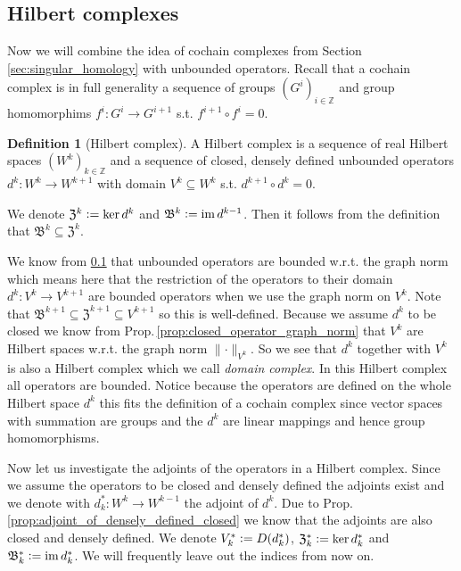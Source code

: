 \documentclass[12pt,a4paper]{article}
\numberwithin{equation}{subsection}
\numberwithin{lemma}{subsection}
\theoremstyle{definition}
\newtheorem{definition}[lemma]{Definition}
\DeclareMathOperator{\Ima}{im}
\newcommand{\integers}{\mathbb{Z}}
\begin{document}
\subsection{Hilbert complexes}

Now we will combine the idea of cochain complexes from Section 
\ref{sec:singular_homology} 
with unbounded operators. Recall that a cochain complex 
is in full generality a sequence of groups $(G^i)_{i\in \integers}$ 
and group homomorphims $f^i: G^i \rightarrow G^{i+1}$ s.t. 
$f^{i+1} \circ f^{i} = 0$.

\begin{definition}[Hilbert complex]
    A Hilbert complex is a sequence of real Hilbert spaces $(W^k)_{k\in \integers}$
    and a sequence of closed, densely defined 
    unbounded operators $d^k: W^k \rightarrow W^{k+1}$ with domain
    $V^k \subseteq W^k$ s.t. $d^{k+1} \circ d^k = 0$.
\end{definition}
\noindent We denote $\mathfrak{Z}^k  \vcentcolon= \ker d^k$ and $\mathfrak{B}^k 
\vcentcolon= \Ima d^{k-1}$. Then it follows from the definition that
$\mathfrak{B}^k \subseteq \mathfrak{Z}^k$.

We know from \ref{} that unbounded operators are bounded w.r.t. the graph norm
which means here that the restriction of the operators to their domain 
$d^k: V^k \rightarrow V^{k+1}$ are bounded operators when we use the graph norm
on $V^k$. Note that $\mathfrak{B}^{k+1} \subseteq \mathfrak{Z}^{k+1} 
\subseteq V^{k+1}$
so this is well-defined. Because we assume $d^k$ to be 
closed we know from Prop.\,\ref{prop:closed_operator_graph_norm}
that $V^k$ are Hilbert spaces w.r.t. the graph norm $\lVert \cdot \rVert _{V^k}$.
So we see that $d^k$ together with $V^k$ is also a Hilbert complex which 
we call \textit{domain complex}. In this Hilbert complex all operators are 
bounded. Notice because the operators are defined on the whole Hilbert space 
$d^k$ this fits the definition of a cochain complex since vector spaces 
with summation
are groups and the $d^k$ are linear mappings and hence group homomorphisms.

Now let us investigate the adjoints of the operators in a Hilbert complex.
Since we assume the operators to be closed and densely defined the adjoints 
exist and we denote with $d_k^*:W^k \rightarrow W^{k-1}$ the adjoint of $d^k$.
Due to Prop.\,\ref{prop:adjoint_of_densely_defined_closed} we know that the 
adjoints are also closed and densely defined. We denote 
$V_k^* \vcentcolon= D(d_k^*)$, $\mathfrak{Z}^*_k \vcentcolon= \ker d^*_k$ 
and $\mathfrak{B}^*_k \vcentcolon= \Ima d^*_k$. We will frequently leave out 
the indices from now on.
\end{document}
